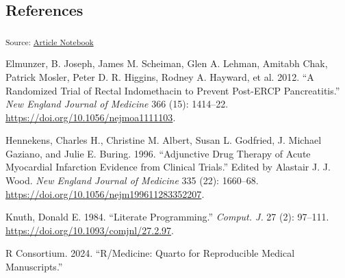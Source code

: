 \documentclass[
  letterpaper,
  DIV=11,
  numbers=noendperiod]{scrartcl}
\newlength{\cslhangindent}
\newenvironment{CSLReferences}[2] %
 {\begin{list}{}{%
  \setlength{\itemindent}{0pt}
  \setlength{\leftmargin}{0pt}
  \setlength{\parsep}{0pt}
  \ifodd #1
   \setlength{\leftmargin}{\cslhangindent}
   \setlength{\itemindent}{-1\cslhangindent}
  \fi
  \setlength{\itemsep}{#2\baselineskip}}}
 {\end{list}}
\begin{document}
\subsection{References}\label{references}

\textsubscript{Source:
\href{https://rccline.github.io/quarto-manuscript01/index.qmd.html}{Article
Notebook}}

\label{refs}
\begin{CSLReferences}{1}{0}
Elmunzer, B. Joseph, James M. Scheiman, Glen A. Lehman, Amitabh Chak,
Patrick Mosler, Peter D. R. Higgins, Rodney A. Hayward, et al. 2012.
{``A Randomized Trial of Rectal Indomethacin to Prevent Post-ERCP
Pancreatitis.''} \emph{New England Journal of Medicine} 366 (15):
1414--22. \url{https://doi.org/10.1056/nejmoa1111103}.

Hennekens, Charles H., Christine M. Albert, Susan L. Godfried, J.
Michael Gaziano, and Julie E. Buring. 1996. {``Adjunctive Drug Therapy
of Acute Myocardial Infarction {\textemdash} Evidence from Clinical
Trials.''} Edited by Alastair J. J. Wood. \emph{New England Journal of
Medicine} 335 (22): 1660--68.
\url{https://doi.org/10.1056/nejm199611283352207}.

Knuth, Donald E. 1984. {``Literate Programming.''} \emph{Comput. J.} 27
(2): 97--111. \url{https://doi.org/10.1093/comjnl/27.2.97}.

R Consortium. 2024. {``R/{Medicine}: {Quarto} for {Reproducible Medical
Manuscripts}.''}

\end{CSLReferences}
\end{document}
